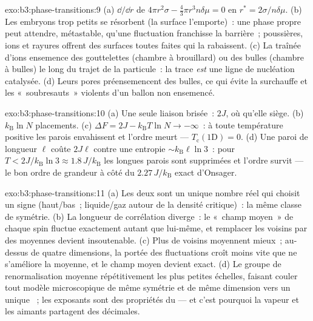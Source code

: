 \begin{solution}{exo:b3:phase-transitions:9}
(a) $\dd/\dd r$ de $4\pi r^2\sigma - \tfrac43\pi r^3n\delta\mu = 0$
en $r^* = 2\sigma/n\delta\mu$. (b) Les embryons trop petits se
résorbent (la surface l'emporte)~: une phase propre peut attendre,
métastable, qu'une fluctuation franchisse la barrière~; poussières,
ions et rayures offrent des surfaces toutes faites qui la
rabaissent. (c) La traînée d'ions ensemence des gouttelettes
(chambre à brouillard) ou des bulles (chambre à bulles) le long du
trajet de la particule~: la trace \emph{est} une ligne de nucléation
catalysée. (d) Leurs pores préensemencent des bulles, ce qui évite
la surchauffe et les «~soubresauts~» violents d'un ballon non
ensemencé.
\end{solution}

\begin{solution}{exo:b3:phase-transitions:10}
(a) Une seule liaison brisée~: $2J$, où qu'elle siège. (b)
$k_{\text{B}}\ln N$ placements. (c) $\Delta F = 2J -
k_{\text{B}}T\ln N \to -\infty$~: à toute température positive les
parois envahissent et l'ordre meurt --- $T_{\text{c}}(1\text{D}) = 0$. (d)
Une paroi de longueur $\ell$ coûte $2J\ell$ contre une entropie
$\sim k_{\text{B}}\ell\ln3$~: pour $T < 2J/k_{\text{B}}\ln3 \approx
1.8\,J/k_{\text{B}}$ les longues parois sont supprimées et l'ordre
survit --- le bon ordre de grandeur à côté du
$2.27\,J/k_{\text{B}}$ exact d'Onsager.
\end{solution}

\begin{solution}{exo:b3:phase-transitions:11}
(a) Les deux  sont un unique nombre réel qui
choisit un signe (haut/bas~; liquide/gaz autour de la densité
critique)~: la même classe de symétrie. (b) La longueur de
corrélation diverge~: le «~champ moyen~» de chaque spin fluctue
exactement autant que lui-même, et remplacer les voisins par des
moyennes devient insoutenable. (c) Plus de voisins moyennent mieux~;
au-dessus de quatre dimensions, la portée des fluctuations croît
moins vite que ne s'améliore la moyenne, et le champ moyen devient
exact. (d) Le groupe de renormalisation moyenne répétitivement les
plus petites échelles, faisant couler tout modèle microscopique de
même symétrie et de même dimension vers un unique ~; les
exposants sont des propriétés du  --- et c'est pourquoi la
vapeur et les aimants partagent des décimales.
\end{solution}

